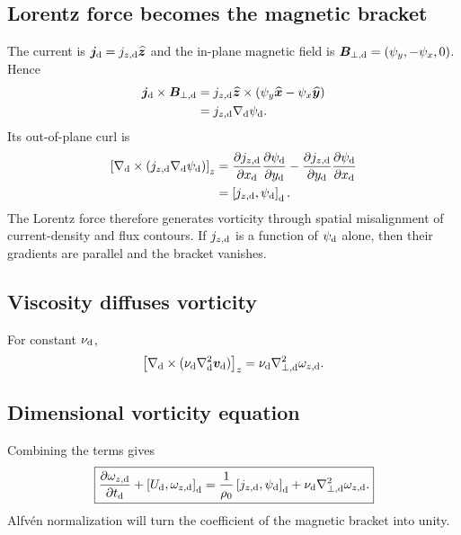 \documentclass[11pt]{article}
\newcommand{\vect}[1]{\bm{#1}}
\newcommand{\bracket}[2]{\left[#1,#2\right]}
\begin{document}
\subsection{Lorentz force becomes the magnetic bracket}

The current is $\vect{j}_{\rm d}=j_{z,\rm d}\widehat{\vect{z}}$ and the in-plane magnetic field is $\vect{B}_{\perp,\rm d}=(\psi_y,-\psi_x,0)$. Hence
\begin{align}
\vect{j}_{\rm d}\times\vect{B}_{\perp,\rm d}
&=j_{z,\rm d}\widehat{\vect{z}}
\times(\psi_y\widehat{\vect{x}}-\psi_x\widehat{\vect{y}})\\
&=j_{z,\rm d}\nabla_{\rm d}\psi_{\rm d}.
\label{eq:lorentzgradpsi}
\end{align}
Its out-of-plane curl is
\begin{align}
\left[\nabla_{\rm d}\times
(j_{z,\rm d}\nabla_{\rm d}\psi_{\rm d})\right]_z
&=\frac{\partial j_{z,\rm d}}{\partial x_{\rm d}}
\frac{\partial\psi_{\rm d}}{\partial y_{\rm d}}
-\frac{\partial j_{z,\rm d}}{\partial y_{\rm d}}
\frac{\partial\psi_{\rm d}}{\partial x_{\rm d}}\\
&=\bracket{j_{z,\rm d}}{\psi_{\rm d}}_{\rm d}.
\end{align}
The Lorentz force therefore generates vorticity through spatial misalignment of current-density and flux contours. If $j_{z,\rm d}$ is a function of $\psi_{\rm d}$ alone, then their gradients are parallel and the bracket vanishes.

\subsection{Viscosity diffuses vorticity}

For constant $\nu_{\rm d}$,
\begin{equation}
\left[\nabla_{\rm d}\times
(\nu_{\rm d}\nabla_{\rm d}^{2}\vect{v}_{\rm d})\right]_z
=\nu_{\rm d}\nabla_{\perp,\rm d}^{2}\omega_{z,\rm d}.
\end{equation}

\subsection{Dimensional vorticity equation}

Combining the terms gives
\begin{equation}
\boxed{
\frac{\partial\omega_{z,\rm d}}{\partial t_{\rm d}}
+\bracket{U_{\rm d}}{\omega_{z,\rm d}}_{\rm d}
=\frac{1}{\rho_0}\bracket{j_{z,\rm d}}{\psi_{\rm d}}_{\rm d}
+\nu_{\rm d}\nabla_{\perp,\rm d}^{2}\omega_{z,\rm d}.}
\label{eq:vorticity_dim}
\end{equation}
Alfv\'en normalization will turn the coefficient of the magnetic bracket into unity.
\end{document}
